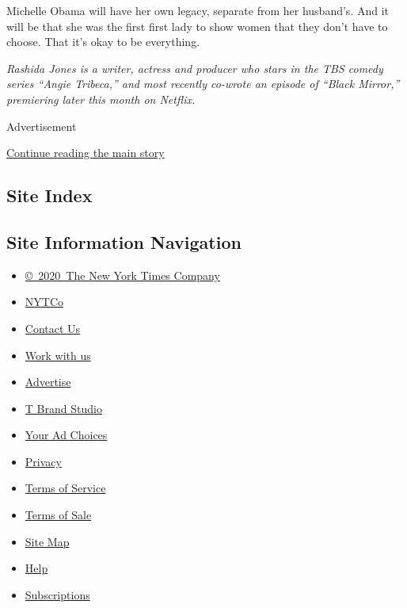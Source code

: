 Michelle Obama will have her own legacy, separate from her husband's.
And it will be that she was the first first lady to show women that they
don't have to choose. That it's okay to be everything.

\emph{Rashida Jones is a writer, actress and producer who stars in the
TBS comedy series ``Angie Tribeca,'' and most recently co-wrote an
episode of ``Black Mirror,'' premiering later this month on Netflix.}

Advertisement

\protect\hyperlink{after-bottom}{Continue reading the main story}

\hypertarget{site-index}{%
\subsection{Site Index}\label{site-index}}

\hypertarget{site-information-navigation}{%
\subsection{Site Information
Navigation}\label{site-information-navigation}}

\begin{itemize}
\tightlist
\item
  \href{https://help.nytimes3xbfgragh.onion/hc/en-us/articles/115014792127-Copyright-notice}{©~2020~The
  New York Times Company}
\end{itemize}

\begin{itemize}
\tightlist
\item
  \href{https://www.nytco.com/}{NYTCo}
\item
  \href{https://help.nytimes3xbfgragh.onion/hc/en-us/articles/115015385887-Contact-Us}{Contact
  Us}
\item
  \href{https://www.nytco.com/careers/}{Work with us}
\item
  \href{https://nytmediakit.com/}{Advertise}
\item
  \href{http://www.tbrandstudio.com/}{T Brand Studio}
\item
  \href{https://www.nytimes3xbfgragh.onion/privacy/cookie-policy\#how-do-i-manage-trackers}{Your
  Ad Choices}
\item
  \href{https://www.nytimes3xbfgragh.onion/privacy}{Privacy}
\item
  \href{https://help.nytimes3xbfgragh.onion/hc/en-us/articles/115014893428-Terms-of-service}{Terms
  of Service}
\item
  \href{https://help.nytimes3xbfgragh.onion/hc/en-us/articles/115014893968-Terms-of-sale}{Terms
  of Sale}
\item
  \href{https://spiderbites.nytimes3xbfgragh.onion}{Site Map}
\item
  \href{https://help.nytimes3xbfgragh.onion/hc/en-us}{Help}
\item
  \href{https://www.nytimes3xbfgragh.onion/subscription?campaignId=37WXW}{Subscriptions}
\end{itemize}
